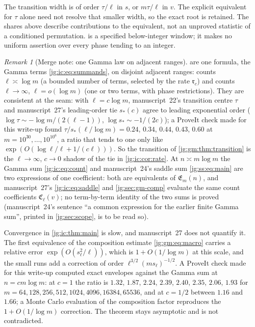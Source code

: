 \documentclass[11pt,a4paper]{article}
\theoremstyle{definition}\newaliascnt{definition}{theorem}
\theoremstyle{remark}\newaliascnt{remark}{theorem}
\newtheorem{remark}[remark]{Remark}
\begin{document}
The transition width is of order $\tau/\ell$ in $s$, or $m\tau/\ell$ in $v$.
The explicit equivalent for $\tau$ alone need not resolve that smaller width, so
the exact root is retained. The shares above describe contributions to the
equivalent, not an unproved statistic of a conditioned permutation.
 is a specified below-integer window; it makes no
uniform assertion over every phase tending to an integer.

\begin{remark}[Merge note: one Gamma law on adjacent ranges]
\label{jg:rem:gamma}
 are one formula,
the Gamma terms \eqref{jg:ic:eq:summands}, on disjoint adjacent ranges: counts
$\ell\asymp\log m$ (a bounded number of terms, selected by the rate
$\mathfrak r_c$) and counts $\ell\to\infty$, $\ell=o(\log m)$ (one or two terms,
with phase restrictions). They are consistent at the seam: with
$\ell=c\log m$, manuscript~22's transition centre $\tau$ and manuscript~27's
leading-order tie $s_*(c)$ agree to leading exponential order
($\log\tau\sim-\log m/(2(\ell-1))$, $\log s_*\sim-1/(2c)$); a ProveIt check made
for this write-up found $\tau/s_*(\ell/\log m)=0.24$, $0.34$, $0.44$, $0.43$,
$0.60$ at $m=10^{30},\ldots,10^{10^6}$, a ratio that tends to one only like
$\exp(O(\log\ell/\ell+1/(c\ell)))$. So the transition of
\cref{jg:gm:thm:transition} is the $\ell\to\infty$, $c\to0$ shadow of the tie in
\cref{jg:ic:cor:rate}. At $n\asymp m\log m$ the Gamma sum
\eqref{jg:ic:eq:count} and manuscript~24's saddle sum \eqref{jg:ss:eq:main} are
two expressions of one coefficient: both are equivalents of $\mathfrak E_m(n)$,
and manuscript~27's \eqref{jg:ic:eq:saddle} and \cref{jg:sec:gm-comp} evaluate
the same count coefficients $\mathfrak C_\ell(v)$; no term-by-term identity of
the two sums is proved (manuscript~24's sentence ``a common expression for the
earlier finite Gamma sum'', printed in \cref{jg:sec:scope}, is to be read so).

Convergence in \cref{jg:ic:thm:main} is slow, and manuscript~27 does not
quantify it. The first equivalence of the composition estimate
\eqref{jg:gm:eq:macro} carries a relative error $\exp(O(s_\ell^2/\ell))$, which
is $1+O(1/\log m)$ at this scale, and the small runs add a correction of order
$\ell^{3/2}(ms_\ell)^{-1/2}$. A ProveIt check made for this write-up computed
exact envelopes against the Gamma sum at $n=cm\log m$: at $c=1$ the ratio is
$1.32$, $1.87$, $2.24$, $2.39$, $2.40$, $2.35$, $2.06$, $1.93$ for
$m=64,128,256,512,1024,4096,16384,65536$, and at $c=1/2$ between $1.16$ and
$1.66$; a Monte Carlo evaluation of the composition factor reproduces the
$1+O(1/\log m)$ correction. The theorem stays asymptotic and is not
contradicted.
\end{remark}
\end{document}
